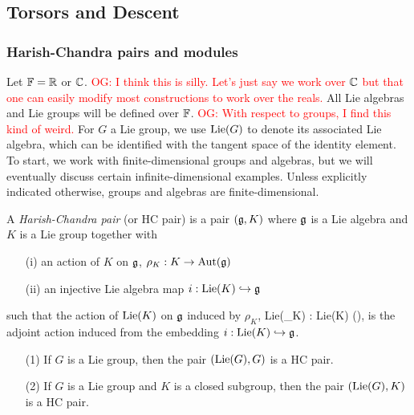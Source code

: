 \documentclass[10pt]{amsart}
\def\owen{\textcolor{red}{OG: }\textcolor{red}}
\begin{document}
\subsection{Torsors and Descent}


\subsubsection{Harish-Chandra pairs and modules}
Let $\mathbb{F} = \mathbb R$ or $\mathbb C$. 
\owen{I think this is silly. Let's just say we work over $\mathbb C$ but that one can easily modify most constructions to work over the reals.}
All Lie algebras and Lie groups will be defined over $\mathbb{F}$. 
\owen{With respect to groups, I find this kind of weird.}
For $G$ a Lie group, we use ${\rm Lie}(G)$ to denote its associated Lie algebra, which can be identified with the tangent space of the identity element.
To start, we work with finite-dimensional groups and algebras, but we will eventually discuss certain infinite-dimensional examples.
Unless explicitly indicated otherwise, groups and algebras are finite-dimensional.
 
\begin{dfn} 
A {\em Harish-Chandra pair} (or HC pair) is a pair $(\mathfrak g, K)$ where $\mathfrak g$ is a Lie algebra and $K$ is a Lie group together with
\begin{itemize}
\item[(i)] an action of $K$ on $\mathfrak g$, $\rho_K : K \to {\rm Aut}(\mathfrak g)$
\item[(ii)] an injective Lie algebra map $i : {\rm Lie}(K) \hookrightarrow \mathfrak g$
\end{itemize}
such that the action of ${\rm Lie}(K)$ on $\mathfrak g$ induced by $\rho_K$,
\ben
{\rm Lie}(\rho_K) : {\rm Lie}(K) (\fg),
\een
is the adjoint action induced from the embedding $i: {\rm Lie}(K) \hookrightarrow \mathfrak g$.
\end{dfn}

\begin{ex} 
\begin{itemize} 
\item[(1)] If $G$ is a Lie group, then the pair $({\rm Lie}(G), G)$ is a HC pair. 
\item[(2)] If $G$ is a Lie group and $K$ is a closed subgroup, then
  the pair $({\rm Lie}(G), K)$ is a HC pair. 
\end{itemize}
\end{ex}
%
%
\end{document}
